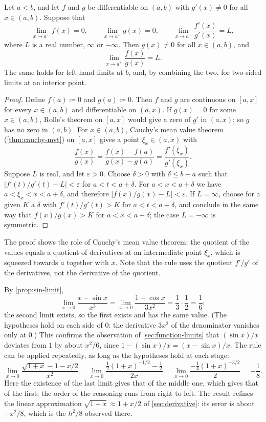 \begin{theorem}
\label{thm:lhopital}
Let $a<b$, and let $f$ and $g$ be differentiable on $(a,b)$ with $g'(x)\ne0$ for all $x\in(a,b)$. Suppose that
\[
\lim_{x\to a^+}f(x)=0,\qquad\lim_{x\to a^+}g(x)=0,\qquad\lim_{x\to a^+}\frac{f'(x)}{g'(x)}=L,
\]
where $L$ is a real number, $\infty$ or $-\infty$. Then $g(x)\ne0$ for all $x\in(a,b)$, and
\[
\lim_{x\to a^+}\frac{f(x)}{g(x)}=L .
\]
The same holds for left-hand limits at $b$, and, by combining the two, for two-sided limits at an interior point.
\end{theorem}

\begin{proof}
Define $f(a)\coloneqq0$ and $g(a)\coloneqq0$. Then $f$ and $g$ are continuous on $[a,x]$ for every $x\in(a,b)$ and differentiable on $(a,x)$. If $g(x)=0$ for some $x\in(a,b)$, Rolle's theorem on $[a,x]$ would give a zero of $g'$ in $(a,x)$; so $g$ has no zero in $(a,b)$. For $x\in(a,b)$, Cauchy's mean value theorem (\cref{thm:cauchy-mvt}) on $[a,x]$ gives a point $\xi_x\in(a,x)$ with
\[
\frac{f(x)}{g(x)}=\frac{f(x)-f(a)}{g(x)-g(a)}=\frac{f'(\xi_x)}{g'(\xi_x)} .
\]
Suppose $L$ is real, and let $\varepsilon>0$. Choose $\delta>0$ with $\delta\le b-a$ such that $|f'(t)/g'(t)-L|<\varepsilon$ for $a<t<a+\delta$. For $a<x<a+\delta$ we have $a<\xi_x<x<a+\delta$, and therefore $|f(x)/g(x)-L|<\varepsilon$. If $L=\infty$, choose for a given $K$ a $\delta$ with $f'(t)/g'(t)>K$ for $a<t<a+\delta$, and conclude in the same way that $f(x)/g(x)>K$ for $a<x<a+\delta$; the case $L=-\infty$ is symmetric.
\end{proof}

The proof shows the role of Cauchy's mean value theorem: the quotient of the values equals a quotient of derivatives at an intermediate point $\xi_x$, which is squeezed towards $a$ together with $x$. Note that the rule uses the quotient $f'/g'$ of the derivatives, not the derivative of the quotient.

By \cref{prop:sin-limit},
\[
\lim_{x\to0}\frac{x-\sin x}{x^3}=\lim_{x\to0}\frac{1-\cos x}{3x^2}=\frac13\cdot\frac12=\frac16 ;
\]
the second limit exists, so the first exists and has the same value. (The hypotheses hold on each side of $0$: the derivative $3x^2$ of the denominator vanishes only at $0$.) This confirms the observation of \cref{sec:function-limits} that $(\sin x)/x$ deviates from $1$ by about $x^2/6$, since $1-(\sin x)/x=(x-\sin x)/x$. The rule can be applied repeatedly, as long as the hypotheses hold at each stage:
\[
\lim_{x\to0}\frac{\sqrt{1+x}-1-x/2}{x^2}=\lim_{x\to0}\frac{\frac12(1+x)^{-1/2}-\frac12}{2x}=\lim_{x\to0}\frac{-\frac14(1+x)^{-3/2}}2=-\frac18 .
\]
Here the existence of the last limit gives that of the middle one, which gives that of the first; the order of the reasoning runs from right to left. The result refines the linear approximation $\sqrt{1+x}\approx1+x/2$ of \cref{sec:derivative}: its error is about $-x^2/8$, which is the $h^2/8$ observed there.

